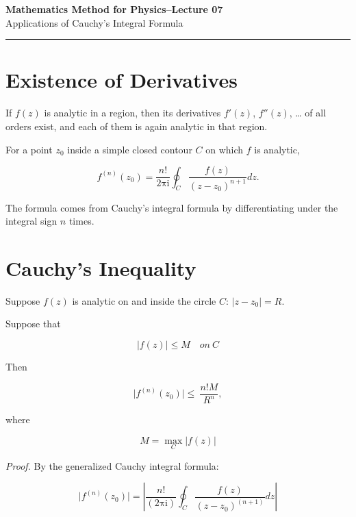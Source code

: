 \documentclass[11pt,a4paper]{article}
\theoremstyle{definition}
\theoremstyle{plain}
\begin{document}
\begin{center}
    {\LARGE \textbf{Mathematics Method for Physics--Lecture 07}} \\[0.6em]
    {\large Applications of Cauchy's Integral Formula}
\end{center}
\vspace{-0.5em}
\noindent\rule{\textwidth}{0.5pt}
\vspace{0.8em}

\section{Existence of Derivatives}

If $f(z)$ is analytic in a region, then its derivatives $f'(z)$, $f''(z)$, … of
all orders exist, and each of them is again analytic in that region.

For a point $z_{0}$ inside a simple closed contour $C$ on which $f$ is analytic,

\[
f^{(n)}(z_{0}) = \frac{n!}{2\mathrm{\pi}\mathrm{i}}\oint_{C}\frac{f(z)}{(z - z_{0})^{n + 1}}dz .
\]

The formula comes from Cauchy's integral formula by differentiating under the
integral sign $n$ times.

\section{Cauchy's Inequality}

Suppose $f(z)$ is analytic on and inside the circle $C$: $\vert{}z - z_{0}\vert{} = R$.

Suppose that

\begin{equation}
\vert{}f(z)\vert{} \le M\quad on\ C
\end{equation}

Then

\begin{equation}
\vert{}f^{(n)}(z_{0})\vert{} \le \ \frac{n!M}{R^{n}},
\end{equation}

where

\begin{equation}
M = \max_{C}\vert{}f(z)\vert{}
\end{equation}

\textit{Proof.} By the generalized Cauchy integral formula:

\[
\vert{}f^{(n)}(z_{0})\vert{} = \left\vert{}\frac{n!}{(2\mathrm{\pi}\mathrm{i})}\oint_{C}\frac{f(z)}{(z - z_{0})^{(n + 1)}}dz\right\vert{}
\]
\end{document}
